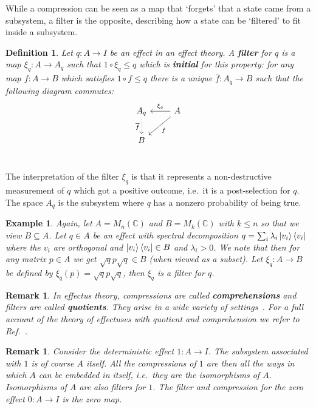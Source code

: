 \documentclass[a4paper,onecolumn,10pt,accepted=2019-05-03, issue=1, volume=1, shorttitle=papers/compositionality-1-1]{compositionalityarticle}
\newcounter{counter}
\numberwithin{counter}{section}
\newtheorem{definition}[counter]{Definition}
\newtheorem{remark}[counter]{Remark}
\newtheorem{example}[counter]{Example}
\newcommand{\C}{\mathbb{C}}
\newcommand{\cl}[1]{\overline{#1}}
\begin{document}
While a compression can be seen as a map that `forgets' that a state came from a subsystem, a filter is the opposite, describing how a state can be `filtered' to fit inside a subsystem.


\begin{definition}\label{def:filter}
    Let $q:A\rightarrow I$ be an effect in an effect theory. A \textbf{filter} for $q$ is a map $\xi_q:A\rightarrow A_q$ such that $1\circ\xi_q\leq q$ which is \textbf{initial} for this property: for any map $f:A\rightarrow B$ which satisfies $1\circ f\leq q$ there is a unique $\cl{f}:A_q\rightarrow B$ such that the following diagram commutes:
    \[\begin{tikzcd}[ampersand replacement = \&]
    A_q \arrow[dotted,swap]{d}{\cl{f}}\&\arrow[swap]{l}{\xi_q} A\arrow{dl}{f} \\
     B\&  \\
    \end{tikzcd}\]
\end{definition}

\noindent The interpretation of the filter $\xi_q$ is that it represents a non-destructive measurement of $q$ which got a positive outcome, i.e.\ it is a post-selection for $q$. The space $A_q$ is the subsystem where $q$ has a nonzero probability of being true.

\begin{example}
    Again, let $A=M_n(\C)$ and $B=M_k(\C)$ with $k\leq n$ so that we view $B\subseteq A$. Let $q\in A$ be an effect with spectral decomposition $q=\sum_i \lambda_i \ket{v_i}\bra{v_i}$ where the $v_i$ are orthogonal and $\ket{v_i}\bra{v_i}\in B$ and $\lambda_i > 0$. We note that then for any matrix $p\in A$ we get $\sqrt{q}p\sqrt{q}\in B$ (when viewed as a subset). Let $\xi_q: A\rightarrow B$ be defined by $\xi_q(p) = \sqrt{q}p\sqrt{q}$, then $\xi_q$ is a filter for $q$.
\end{example}

\begin{remark}
    In effectus theory, compressions are called \textbf{comprehensions} and filters are called \textbf{quotients}. They arise in a wide variety of settings~\cite{cho2015quotient}. For a full account of the theory of effectuses with quotient and comprehension we refer to Ref.~\cite{basthesis}.
\end{remark}

\begin{remark}
    Consider the deterministic effect $1:A\rightarrow I$. The subsystem associated with $1$ is of course $A$ itself. All the compressions of $1$ are then all the ways in which $A$ can be embedded in itself, i.e.\ they are the isomorphisms of $A$. Isomorphisms of $A$ are also filters for $1$. The filter and compression for the zero effect $0:A\rightarrow I$ is the zero map.
\end{remark}
\end{document}

